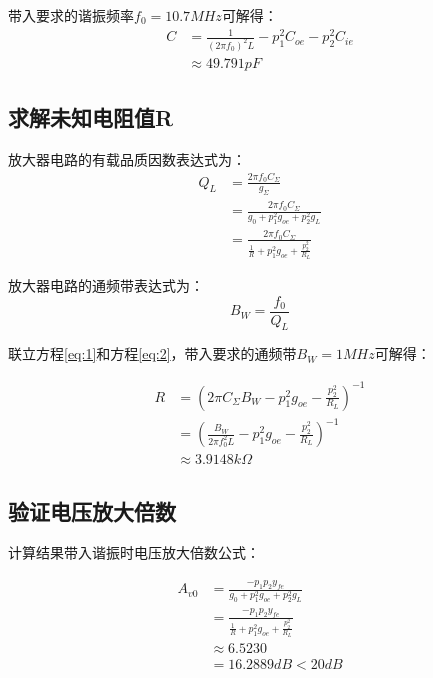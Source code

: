 \documentclass[a4paper]{ctexrep}
\begin{document}
\begin{spacing}{1.5}
带入要求的谐振频率$f_{0}=10.7MHz$可解得：
\begin{equation}
\begin{split}
C&=\frac{1}{(2\pi f_{0})^{2}L}-p_{1}^{2}C_{oe}-p_{2}^{2}C_{ie}\\
&\approx 49.791pF
\end{split}
\end{equation}


\subsection{求解未知电阻值R}

放大器电路的有载品质因数表达式为：
\begin{equation}\label{eq:1}
\begin{split}
Q_{L}&=\frac{2\pi f_{0}C_{\Sigma}}{g_{\Sigma}}\\
&=\frac{2\pi f_{0}C_{\Sigma}}{g_{0}+p_{1}^{2}g_{oe}+p_{2}^{2}g_{L}}\\
&=\frac{2\pi f_{0}C_{\Sigma}}{\frac{1}{R}+p_{1}^{2}g_{oe}+\frac{p_{2}^{2}}{R_{L}}}
\end{split}
\end{equation}

放大器电路的通频带表达式为：
\begin{equation}\label{eq:2}
B_{W}=\frac{f_{0}}{Q_{L}}
\end{equation}

联立方程\ref{eq:1}和方程\ref{eq:2}，带入要求的通频带$B_{W}=1MHz$可解得：

\begin{equation}
\begin{split}
R&=(2\pi C_{\Sigma}B_{W}-p_{1}^{2}g_{oe}-\frac{p_{2}^{2}}{R_{L}})^{-1}\\
&=(\frac{B_{W}}{2\pi f_{0}^{2}L}-p_{1}^{2}g_{oe}-\frac{p_{2}^{2}}{R_{L}})^{-1}\\
&\approx 3.9148k\Omega
\end{split}
\end{equation}

\subsection{验证电压放大倍数}

计算结果带入谐振时电压放大倍数公式：

\begin{equation}
\begin{split}
A_{v0}&=\frac{-p_{1}p_{2}y_{fe}}{g_{0}+p_{1}^{2}g_{oe}+p_{2}^{2}g_{L}}\\
&=\frac{-p_{1}p_{2}y_{fe}}{\frac{1}{R}+p_{1}^{2}g_{oe}+\frac{p_{2}^{2}}{R_{L}}}\\
&\approx 6.5230\\
&=16.2889dB<20dB
\end{split}
\end{equation}


\end{spacing}
\end{document}
